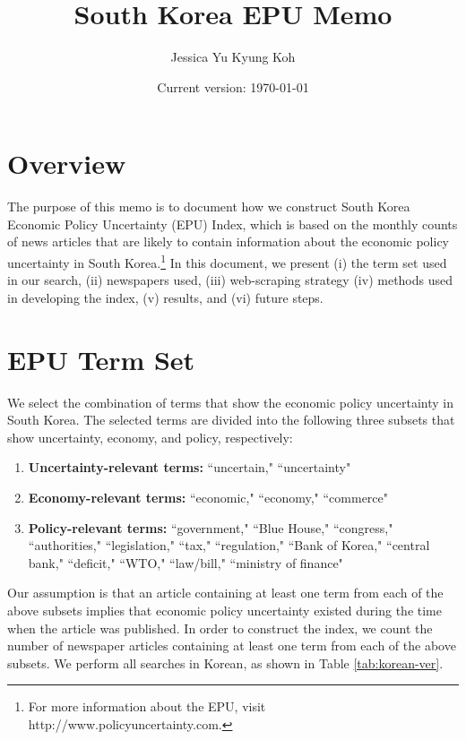 




\title{South Korea EPU Memo}
\author{Jessica Yu Kyung Koh}
\date{Current version: \today}
\maketitle

\doublespace

\section{Overview}
\label{sec:overview}
The purpose of this memo is to document how we construct South Korea Economic Policy Uncertainty (EPU) Index, which is based on the monthly counts of news articles that are likely to contain information about the economic policy uncertainty in South Korea.\footnote{For more information about the EPU, visit http://www.policyuncertainty.com.} In this document, we present (i) the term set used in our search, (ii) newspapers used, (iii) web-scraping  strategy (iv) methods used in developing the index, (v) results, and (vi) future steps. 

\section{EPU Term Set} 
\label{sec:term}
We select the combination of terms that show the economic policy uncertainty in South Korea. The selected terms are divided into the following three subsets that show uncertainty, economy, and policy, respectively: 
\begin{enumerate}
\item \textbf{Uncertainty-relevant terms:} ``uncertain," ``uncertainty"  
\item \textbf{Economy-relevant terms:} ``economic," ``economy," ``commerce"
\item \textbf{Policy-relevant terms:} ``government," ``Blue House," ``congress," ``authorities," ``legislation," ``tax," ``regulation," ``Bank of Korea," ``central bank," ``deficit," ``WTO," ``law/bill," ``ministry of finance"
\end{enumerate}
Our assumption is that an article containing at least one term from each of the above subsets implies that economic policy uncertainty existed during the time when the article was published. In order to construct the index, we count the number of newspaper articles containing at least one term from each of the above subsets. We perform all searches in Korean, as shown in Table \ref{tab:korean-ver}.

